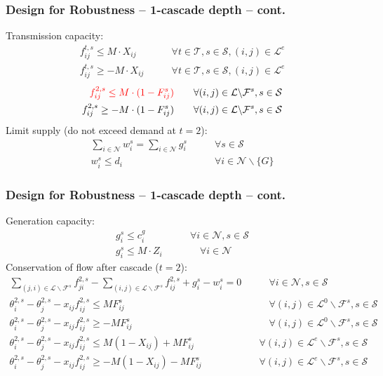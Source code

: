 \documentclass{beamer}
\begin{document}
\begin{frame}
\frametitle{Design for Robustness -- 1-cascade depth -- cont.}\footnotesize
Transmission capacity:
\begin{align*}
	 f_{ij}^{t,s} \leq M\cdot X_{ij} & \qquad \forall t\in\mathcal{T}, s\in\mathcal{S}, (i,j)\in\mathcal{L}^e\\
	 f_{ij}^{t,s} \geq -M\cdot X_{ij} & \qquad \forall t\in\mathcal{T}, s\in\mathcal{S}, (i,j)\in\mathcal{L}^e
\end{align*}
\begin{align*}
	 \color{red}{f_{ij}^{2,s} \leq M\cdot(1-F_{ij}^s)} & \qquad \forall (i,j)\in\mathcal{L}\backslash\mathcal{F}^s, s\in\mathcal{S}\\
	 f_{ij}^{2,s} \geq -M\cdot(1-F_{ij}^s) & \qquad \forall (i,j)\in\mathcal{L}\backslash\mathcal{F}^s, s\in\mathcal{S}
\end{align*}
Limit supply (do not exceed demand at $t=2$):
\begin{align*}
   \sum_{i\in\mathcal{N}}w_i^s = \sum_{i\in\mathcal{N}}g_i^s & \qquad \forall s\in\mathcal{S}\\
   w_i^{s} \leq d_i & \qquad \forall i\in\mathcal{N}\backslash\{G\}
\end{align*}
\end{frame}

\begin{frame}
\frametitle{Design for Robustness -- 1-cascade depth -- cont.}\footnotesize
Generation capacity:
\begin{align*}
	 g_i^{s} \leq c_i^g & \qquad \forall i\in\mathcal{N}, s\in\mathcal{S}\\
	 g_i^{s} \leq M\cdot Z_i & \qquad \quad\forall i\in\mathcal{N}
\end{align*}
Conservation of flow after cascade ($t=2$):
\begin{align*}
	 \sum_{(j,i)\in\mathcal{L}\backslash\mathcal{F}^s}f_{ji}^{2,s}-\sum_{(i,j)\in\mathcal{L}\backslash\mathcal{F}^s}f_{ij}^{2,s} + g_i^s - w_i^s = 0 & \qquad \forall i  \in\mathcal{N}, s\in\mathcal{S}\\
	 \theta_i^{2,s}-\theta_j^{2,s}-x_{ij}f_{ij}^{2,s}\leq M F_{ij}^s & \qquad \forall (i,j)\in\mathcal{L}^0\backslash\mathcal{F}^s, s\in\mathcal{S}\\
	 \theta_i^{2,s}-\theta_j^{2,s}-x_{ij}f_{ij}^{2,s}\geq -M F_{ij}^s & \qquad \forall (i,j)\in\mathcal{L}^0\backslash\mathcal{F}^s, s\in\mathcal{S}\\
	\theta_i^{2,s}-\theta_j^{2,s}-x_{ij}f_{ij}^{2,s}\leq M (1-X_{ij}) + M F_{ij}^s & \quad \forall (i,j)\in\mathcal{L}^e\backslash\mathcal{F}^s, s\in\mathcal{S}\\
	 \theta_i^{2,s}-\theta_j^{2,s}-x_{ij}f_{ij}^{2,s}\geq -M (1-X_{ij}) - M F_{ij}^s & \quad \forall (i,j)\in\mathcal{L}^e\backslash\mathcal{F}^s, s\in\mathcal{S}	
\end{align*}
\end{frame}
\end{document}
